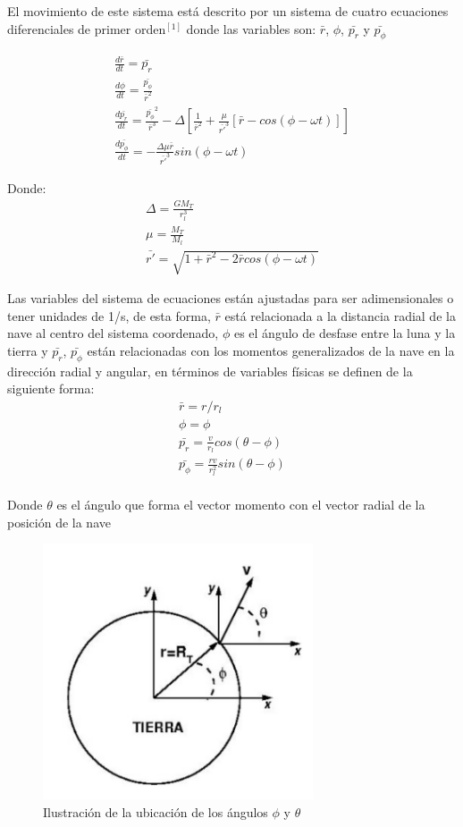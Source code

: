 \documentclass{article}
\begin{document}
El movimiento de este sistema está descrito por un sistema de cuatro ecuaciones diferenciales de primer orden$^{[1]}$ donde las variables son: $\bar{r}$, $\phi$, $\bar{p_r}$ y $\bar{p_{\phi}}$

\begin{align}
\frac{d\bar{r}}{dt}=\bar{p_r}\\
\frac{d\phi}{dt}=\frac{\bar{p_{\phi}}}{\bar{r}^2}\\
\frac{d\bar{p_r}}{dt}=\frac{\bar{p_{\phi}}^2}{\bar{r}^3}-\Delta\left[ \frac{1}{\bar{r}^2} +\frac{\mu}{\bar{r'}^3}[\bar{r}-cos(\phi -\omega t)]\right]\\
\frac{d\bar{p_{\phi}}}{dt}=-\frac{\Delta \mu \bar{r}}{\bar{r'}^3}sin(\phi -\omega t)
\end{align}

Donde:
\begin{align*}
\Delta = \frac{GM_T}{r^3_l}\\
\mu = \frac{M_T}{M_l}\\
\bar{r'}=\sqrt{1+\bar{r}^2-2\bar{r}cos(\phi-\omega t)}
\end{align*}

Las variables del sistema de ecuaciones están ajustadas para ser adimensionales o tener unidades de 1/s, de esta forma, $\bar{r}$ está relacionada a la distancia radial de la nave al centro del sistema coordenado, $\phi$ es el ángulo de desfase entre la luna y la tierra y $\bar{p_r}$, $\bar{p_{\phi}}$ están relacionadas con los momentos generalizados de la nave en la dirección radial y angular, en términos de variables físicas se definen de la siguiente forma:
\begin{align*}
\bar{r} = r/r_l\\
\phi =\phi\\
\bar{p_r} = \frac{v}{r_l}cos(\theta-\phi)\\
\bar{p_{\phi}}=\frac{rv}{r^2_l}sin(\theta-\phi)\\
\end{align*}

Donde $\theta$ es el ángulo que forma el vector momento con el vector radial de la posición de la nave
\begin{figure}[H]
	\centering
	\includegraphics[width=8cm]{Nave-Tierra}
	\caption{Ilustración de la ubicación de los ángulos $\phi$ y $\theta$}
\end{figure}
\end{document}
